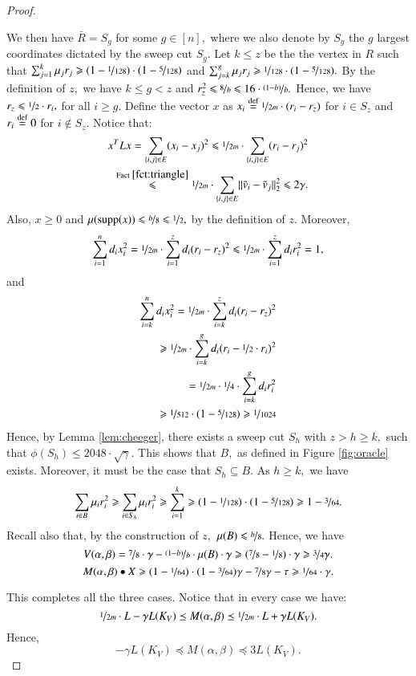 \documentclass[twoside,leqno,twocolumn]{article}
\newcommand{\nfrac}{\nicefrac}
\renewcommand{\leq}{\leqslant}
\renewcommand{\geq}{\geqslant}
\newcommand{\norm}[1]{\lVert#1\rVert}
\newcommand{\supp}{\mathrm{supp}}
\newcommand{\defeq}{\stackrel{\textup{def}}{=}}
\numberwithin{equation}{section}
\begin{document}
\begin{proof}
\begin{itemize}
We then have $\bar{R} = S_g$ for some $g \in [n],$ where we also  denote by  $S_{g}$  the $g$ largest coordinates dictated by the sweep cut $S_{g}.$ 
Let $k \leq z$ be the the vertex in $R$ such that $\sum_{j=1}^{k} \mu_j r_j \geq  (1 - \nfrac{1}{128}) \cdot (1 - \nfrac{5}{128})$ and  $\sum_{j=k}^{g}\mu_j r_j \geq \nfrac{1}{128} \cdot (1 - \nfrac{5}{128}).$ 
By the definition of $z,$ we have $k \leq g < z$ and $r_z^2 \leq \nfrac{8} {b} \leq 16 \cdot \nfrac{(1-b)}{b}.$ Hence, we have $r_z \leq \nfrac{1}{2} \cdot r_i,$ for all $i \geq g.$
Define the vector $x$ as $x_i \defeq \nfrac{1}{2m} \cdot (r_i - r_z)$ for $i \in S_z$ and $r_i \defeq 0$ for $i \notin S_z.$ 
Notice that:
\begin{align*}
x^T L x = \sum_{\{i,j\} \in E} (x_i - x_j)^2 
\leq \nfrac{1}{2m} \cdot  \sum_{\{i,j\} \in E} (r_i - r_j)^2 \\
\stackrel{\rm Fact \; \ref{fct:triangle}}{\leq} 
\nfrac{1}{2m} \cdot \sum_{\{i,j\} \in E} \norm{\tilde{v}_i - \tilde{v}_j}_2^2 \leq  2\gamma.
\end{align*}
Also, $x \geq 0$ and $\mu(\supp(x)) \leq \nfrac{b}{8} \leq \nfrac{1}{2},$ by the definition of $z.$ Moreover,
$$
\sum_{i=1}^n d_i x_i^2 = \nfrac{1}{2m} \cdot \sum_{i=1}^z d_i (r_i - r_z)^2 \leq \nfrac{1}{2m}\cdot \sum_{i=1}^z d_i r_i^2 = 1, 
$$ and
\begin{align*}
\sum_{i=k}^n d_i x_i^2 = \nfrac{1}{2m}\cdot  \sum_{i=k}^z d_i (r_i -r_z)^2 \\
\geq \nfrac{1}{2m} \cdot \sum_{i=k}^g d_i (r_i - \nfrac{1}{2} \cdot r_i)^2 
\\= \nfrac{1}{2m} \cdot \nfrac{1}{4} \cdot \sum_{i=k}^g   d_i r_i^2  
\\ 
\geq \nfrac{1}{512} \cdot (1 - \nfrac{5}{128}) \geq \nfrac{1}{1024}
\end{align*}
Hence, by Lemma \ref{lem:cheeger}, there exists a sweep cut $S_h$ with $ z > h \geq k,$ such that $\phi(S_h) \leq 2048 \cdot \sqrt{\gamma} .$ This shows that $B,$ as defined in Figure \ref{fig:oracle} exists. Moreover, it must be the case that $S_h \subseteq B.$ As $h \geq k,$ we have
$$
\sum_{i \in B} \mu_i r_i^2 \geq \sum_{i \in S_h} \mu_i r_i^2 \geq \sum_{i=1}^k \geq (1 - \nfrac{1}{128}) \cdot (1-\nfrac{5}{128}) \geq 1 - \nfrac{3}{64}.
$$
Recall also that, by the construction of $z,$ $\mu(B) \leq \nfrac{b}{8}.$
Hence, we have 
$$
V(\alpha, \beta) = \nfrac{7}{8} \cdot  \gamma - \nfrac{(1-b)}{b} \cdot \mu(B) \cdot \gamma \geq (\nfrac{7}{8} - \nfrac{1}{8}) \cdot \gamma \geq \nfrac{3}{4} \gamma.
$$
$$
M(\alpha, \beta) \bullet X \geq (1 - \nfrac{1}{64}) \cdot  (1 - \nfrac{3}{64}) \gamma  - \nfrac{7}{8} \gamma - \tau \geq \nfrac{1}{64} \cdot \gamma.
$$
\end{itemize}
This completes all the three cases.
Notice that in every case we have:
$$
\nfrac{1}{2m} \cdot L - \gamma L(K_V) \preceq M(\alpha, \beta) \preceq \nfrac{1}{2m} \cdot L + \gamma L(K_V) .
$$
\noindent
Hence,
$$
 -\gamma L(K_V) \preceq M(\alpha, \beta) \preceq 3 L(K_V).
$$


\end{proof}
\end{document}
